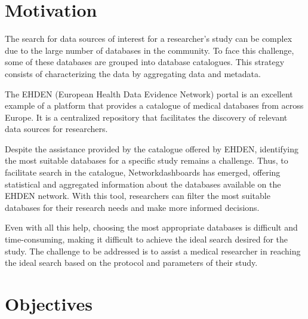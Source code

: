 \section{Motivation}

The search for data sources of interest for a researcher’s study can be complex due to the large number of databases in the community. To face this challenge, some of these databases are grouped into database catalogues. This strategy consists of characterizing the data by aggregating data and metadata.

The EHDEN (European Health Data Evidence Network) portal is an excellent example of a platform that provides a catalogue of medical databases from across Europe. It is a centralized repository that facilitates the discovery of relevant data sources for researchers.

Despite the assistance provided by the catalogue offered by EHDEN, identifying the most suitable databases for a specific study remains a challenge. Thus, to facilitate search in the catalogue, Networkdashboards has emerged, offering statistical and aggregated information about the databases available on the EHDEN network. With this tool, researchers can filter the most suitable databases for their research needs and make more informed decisions.

Even with all this help, choosing the most appropriate databases is difficult and time-consuming, making it difficult to achieve the ideal search desired for the study. The challenge to be addressed is to assist a medical researcher in reaching the ideal search based on the protocol and parameters of their study.


\section{Objectives}



